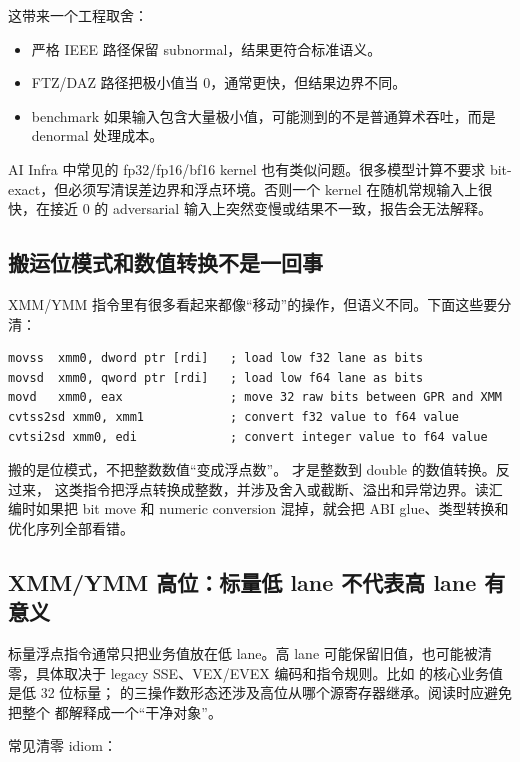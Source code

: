 这带来一个工程取舍：

\begin{itemize}
  \item 严格 IEEE 路径保留 subnormal，结果更符合标准语义。
  \item FTZ/DAZ 路径把极小值当 0，通常更快，但结果边界不同。
  \item benchmark 如果输入包含大量极小值，可能测到的不是普通算术吞吐，而是 denormal 处理成本。
\end{itemize}

AI Infra 中常见的 fp32/fp16/bf16 kernel 也有类似问题。很多模型计算不要求 bit-exact，但必须写清误差边界和浮点环境。否则一个 kernel 在随机常规输入上很快，在接近 0 的 adversarial 输入上突然变慢或结果不一致，报告会无法解释。

\subsection{搬运位模式和数值转换不是一回事}

XMM/YMM 指令里有很多看起来都像“移动”的操作，但语义不同。下面这些要分清：

\begin{lstlisting}
movss  xmm0, dword ptr [rdi]   ; load low f32 lane as bits
movsd  xmm0, qword ptr [rdi]   ; load low f64 lane as bits
movd   xmm0, eax               ; move 32 raw bits between GPR and XMM
cvtss2sd xmm0, xmm1            ; convert f32 value to f64 value
cvtsi2sd xmm0, edi             ; convert integer value to f64 value
\end{lstlisting}

 搬的是位模式，不把整数数值“变成浮点数”。 才是整数到 double 的数值转换。反过来， 这类指令把浮点转换成整数，并涉及舍入或截断、溢出和异常边界。读汇编时如果把 bit move 和 numeric conversion 混掉，就会把 ABI glue、类型转换和优化序列全部看错。

\subsection{XMM/YMM 高位：标量低 lane 不代表高 lane 有意义}

标量浮点指令通常只把业务值放在低 lane。高 lane 可能保留旧值，也可能被清零，具体取决于 legacy SSE、VEX/EVEX 编码和指令规则。比如  的核心业务值是低 32 位标量； 的三操作数形态还涉及高位从哪个源寄存器继承。阅读时应避免把整个  都解释成一个“干净对象”。

常见清零 idiom：

